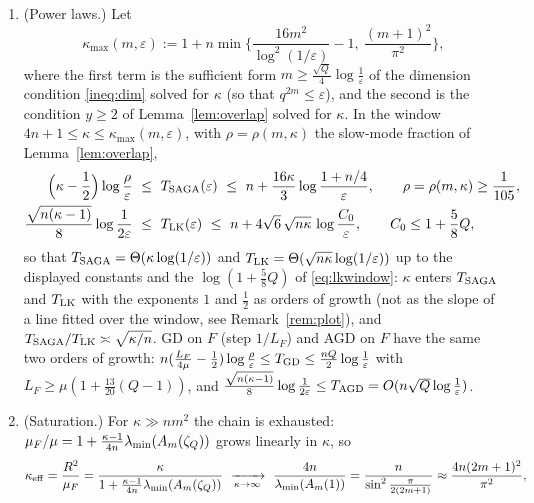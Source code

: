 \begin{proposition}
\begin{enumerate}[nosep,label=(\roman*)]
\item (Power laws.) Let
\begin{equation}
\label{eq:window}
\kappa_{\max}(m,\varepsilon):=1+n\min\Big\{\frac{16m^2}{\log^2(1/\varepsilon)}-1,\ \frac{(m+1)^2}{\pi^2}\Big\},
\end{equation}
where the first term is the sufficient form $m\ge\frac{\sqrt Q}4\log\frac1\varepsilon$ of the dimension condition \eqref{ineq:dim} solved for $\kappa$ (so that $q^{2m}\le\varepsilon$), and the second is the condition $y\ge2$ of Lemma~\ref{lem:overlap} solved for $\kappa$. In the window $4n+1\le\kappa\le\kappa_{\max}(m,\varepsilon)$, with $\rho=\rho(m,\kappa)$ the slow-mode fraction of Lemma~\ref{lem:overlap},
\begin{align}
\label{eq:sagawindow}
\Big(\kappa-\frac12\Big)\log\frac{\rho}{\varepsilon}\ &\le\ T_{\rm SAGA}(\varepsilon)\ \le\ n+\frac{16\kappa}3\log\frac{1+n/4}\varepsilon,\qquad \rho=\rho(m,\kappa)\ge\frac1{105},\\
\label{eq:lkwindow}
\frac{\sqrt{n(\kappa-1)}}8\log\frac1{2\varepsilon}\ &\le\ T_{\rm LK}(\varepsilon)\ \le\ n+4\sqrt6\,\sqrt{n\kappa}\,\log\frac{C_0}\varepsilon,\qquad C_0\le1+\frac58Q ,
\end{align}
so that $T_{\rm SAGA}=\Theta(\kappa\log(1/\varepsilon))$ and $T_{\rm LK}=\Theta(\sqrt{n\kappa}\log(1/\varepsilon))$ up to the displayed constants and the $\log(1+\frac58Q)$ of \eqref{eq:lkwindow}: $\kappa$ enters $T_{\rm SAGA}$ and $T_{\rm LK}$ with the exponents $1$ and $\frac12$ as orders of growth (not as the slope of a line fitted over the window, see Remark~\ref{rem:plot}), and $T_{\rm SAGA}/T_{\rm LK}\asymp\sqrt{\kappa/n}$. GD on $F$ (step $1/L_F$) and AGD on $F$ have the same two orders of growth: $n(\frac{L_F}{4\mu}-\frac12)\log\frac\rho\varepsilon\le T_{\rm GD}\le\frac{nQ}2\log\frac1\varepsilon$ with $L_F\ge\mu(1+\frac{13}{20}(Q-1))$, and $\frac{\sqrt{n(\kappa-1)}}8\log\frac1{2\varepsilon}\le T_{\rm AGD}=O(n\sqrt Q\log\frac1\varepsilon)$.
\item (Saturation.) For $\kappa\gg nm^2$ the chain is exhausted: $\mu_F/\mu=1+\frac{\kappa-1}{4n}\lambda_{\min}(A_m(\zeta_Q))$ grows linearly in $\kappa$, so
\begin{equation}
\label{eq:kappaeff}
\kappa_{\rm eff}=\frac{R^2}{\mu_F}=\frac{\kappa}{1+\frac{\kappa-1}{4n}\lmin(A_m(\zeta_Q))}\ \xrightarrow[\kappa\to\infty]{}\ \frac{4n}{\lmin(A_m(1))}=\frac{n}{\sin^2\frac{\pi}{2(2m+1)}}\approx\frac{4n(2m+1)^2}{\pi^2},
\end{equation}

\end{enumerate}
\end{proposition}
